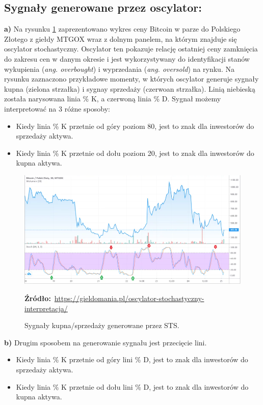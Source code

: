 \documentclass[12pt,a4paper,twoside, inzynierska]{pwr_wmat_praca_dyplomowa}
\theoremstyle{plain}
\numberwithin{theorem}{chapter}
\theoremstyle{definition}
\numberwithin{theorem}{chapter}
\begin{document}
	\subsection{Sygnały generowane przez oscylator:}
	 \textbf{a)} Na rysunku \ref{fig:OSa} zaprezentowano wykres ceny Bitcoin w parze do Polskiego Złotego z giełdy MTGOX wraz z dolnym panelem, na którym znajduje się oscylator stochastyczny. Oscylator ten pokazuje relację ostatniej ceny zamknięcia do zakresu cen w danym okresie i jest wykorzystywany do identyfikacji stanów wykupienia (\emph{ang. overbought}) i wyprzedania (\textit{ang. oversold}) na rynku. Na rysunku zaznaczono przykładowe momenty, w których oscylator generuje sygnały kupna (zielona strzałka) i sygnay sprzedaży (czerwoan strzałka). Linią niebieską została narysowana linia \% K, a czerwoną linia \% D. Sygnał możemy interpretować na 3 różne sposoby:
	
	\begin{itemize} 
		\item Kiedy linia \% K przetnie od góry poziom 80, jest to znak dla inwestorów do sprzedaży aktywa. 
		\item Kiedy linia \% K przetnie od dołu poziom 20, jest to znak dla inwestorów do kupna aktywa. 
	\end{itemize}
	\vspace{12pt}
	\begin{figure}[H]
		\centering
		\includegraphics[width=1\textwidth]{STSa.png}
		\caption{Sygnały kupna/sprzedaży generowane przez STS.}
		\label{fig:OSa}
		\textbf{Źródło:}\
		\url{https://gieldomania.pl/oscylator-stochastyczny-interpretacja/}
	\end{figure}
	\vspace{12pt}	 	
	 
	\noindent \textbf{b)} Drugim sposobem na generowanie sygnału jest przecięcie lini. 
	 
	\begin{itemize} 
	 	\item Kiedy linia \% K przetnie od góry lini \% D, jest to znak dla inwestorów do sprzedaży aktywa. 
	 	\item Kiedy linia \% K przetnie od dołu lini \% D, jest to znak dla inwestorów do kupna aktywa. 
	\end{itemize}
	
\end{document}
